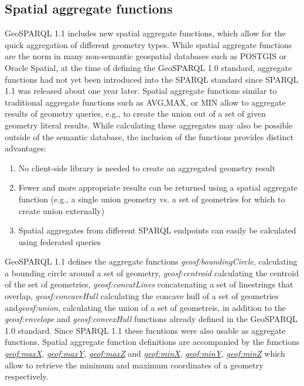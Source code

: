 \documentclass[runningheads]{llncs}
\begin{document}
\subsection{Spatial aggregate functions}\label{sec:spatialaggregate}
GeoSPARQL 1.1 includes new spatial aggregate functions, which allow for the quick aggregation of different geometry types. While spatial aggregate functions are the norm in many non-semantic geospatial databases such as POSTGIS or Oracle Spatial, at the time of defining the GeoSPARQL 1.0 standard, aggregate functions had not yet been introduced into the SPARQL standard since SPARQL 1.1 \cite{w3c_sparql_working_group_sparql_2013} was released about one year later. Spatial aggregate functions similar to traditional aggregate functions such as AVG,MAX, or MIN allow to aggregate results of geometry queries, e.g., to create the union out of a set of given geometry literal results. While calculating these aggregates may also be possible outside of the semantic database, the inclusion of the functions provides distinct advantages:
\begin{enumerate}
    \item No client-side library is needed to create an aggregated geometry result
    \item Fewer and more appropriate results can be returned using a spatial aggregate function (e.g., a single union geometry vs. a set of geometries for which to create union externally)
    \item Spatial aggregates from different SPARQL endpoints can easily be calculated using federated queries 
\end{enumerate}
GeoSPARQL 1.1 defines the aggregate functions \emph{geosf:boundingCircle}, calculating a bounding circle around a set of geometry, \emph{geosf:centroid} calculating the centroid of the set of geometries, \emph{geosf:concatLines} concatenating a set of linestrings that overlap, \emph{geosf:concaveHull} calculating the concave hull of a set of geometries and\emph{geosf:union}, calculating the union of a set of geometreis, in addition to the \emph{geosf:envelope} and \emph{geosf:convexHull} functions already defined in the GeoSPARQL 1.0 standard. Since SPARQL 1.1 these fucntions were also usable as aggregate functions.
Spatial aggregate function definitions are accompanied by the functions \href{http://www.opengis.net/def/function/geosparql/maxX}{\emph{geof:maxX}}, \href{http://www.opengis.net/def/function/geosparql/maxY}{\emph{geof:maxY}}, \href{http://www.opengis.net/def/function/geosparql/maxZ}{\emph{geof:maxZ}} and \href{http://www.opengis.net/def/function/geosparql/minX}{\emph{geof:minX}}, \href{http://www.opengis.net/def/function/geosparql/minY}{\emph{geof:minY}}, \href{http://www.opengis.net/def/function/geosparql/minZ}{\emph{geof:minZ}} which allow to retrieve the minimum and maximum coordinates of a geometry respectively.
\end{document}
